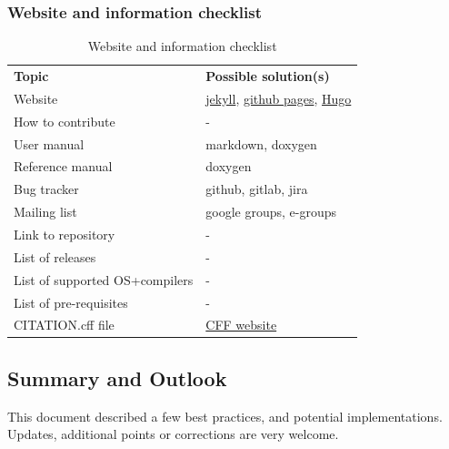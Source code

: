 \documentclass[12pt,a4paper]{article}
\begin{document}
\subsubsection{Website and information checklist}\label{website-and-information-checklist}

\begin{table}[H]
  \caption{Website and information checklist}
  \label{tab:website-and-information-checklist}
  \begin{tabular}{ll}
    \toprule
    \textbf{Topic} & \textbf{Possible solution(s)}\\
  Website & \href{https://jekyllrb.com}{jekyll},
  \href{https://pages.github.com}{github pages}, \href{https://gohugo.io}{Hugo} \\
  How to contribute & - \\
  User manual & markdown, doxygen \\
  Reference manual & doxygen \\
  Bug tracker & github, gitlab, jira \\
  Mailing list & google groups, e-groups \\
  Link to repository & - \\
  List of releases & - \\
  List of supported OS+compilers & - \\
  List of pre-requisites & - \\
  CITATION.cff file & \href{https://citation-file-format.github.io}{CFF website} \\
  \end{tabular}
\end{table}

\subsection{Summary and Outlook}\label{summary-and-outlook}

This document described a few best practices, and potential
implementations. Updates, additional points or corrections are very
welcome.
\end{document}
